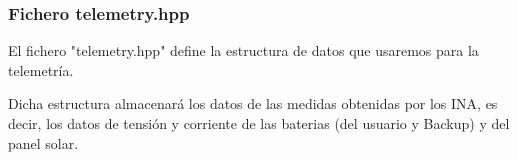 \subsubsection{Fichero telemetry.hpp}

El fichero "telemetry.hpp" define la estructura de datos que usaremos para la telemetría.

Dicha estructura almacenará los datos de las medidas obtenidas por los INA, es decir, los datos de tensión y corriente de las baterias (del usuario y Backup) y del panel solar.
